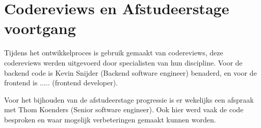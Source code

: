 \section{Codereviews en Afstudeerstage voortgang}
Tijdens het ontwikkelproces is gebruik gemaakt van codereviews, deze codereviews werden uitgevoerd door specialisten van hun discipline.
Voor de backend code is Kevin Snijder (Backend software engineer) benaderd, en voor de frontend is ..... (frontend developer).

\whitespace
Voor het bijhouden van de afstudeerstage progressie is er wekelijks een afspraak met Thom Koenders (Senior software engineer).
Ook hier werd vaak de code besproken en waar mogelijk verbeteringen gemaakt kunnen worden.
